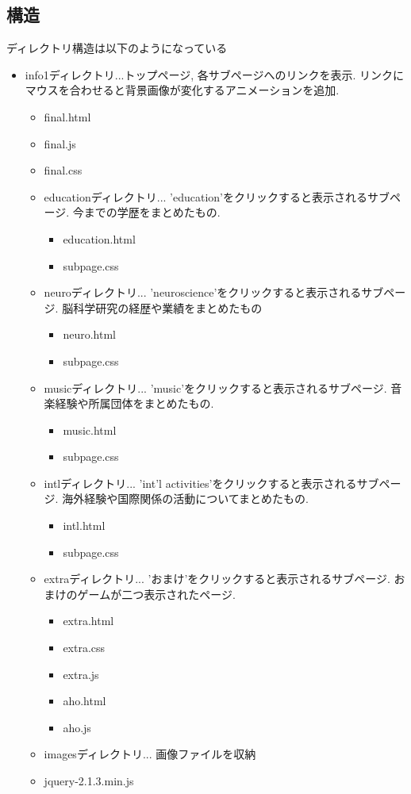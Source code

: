 \documentclass{jarticle}
\begin{document}
\subsection{構造}
ディレクトリ構造は以下のようになっている
\begin{itemize}
	\item info1ディレクトリ...トップページ, 各サブページへのリンクを表示. リンクにマウスを合わせると背景画像が変化するアニメーションを追加.
			\begin{itemize}
				\item final.html
				\item final.js
				\item final.css
		\item educationディレクトリ... 'education'をクリックすると表示されるサブページ. 今までの学歴をまとめたもの.
			\begin{itemize}
				\item education.html
				\item subpage.css
			\end{itemize}
		\item neuroディレクトリ... 'neuroscience'をクリックすると表示されるサブページ. 脳科学研究の経歴や業績をまとめたもの
			\begin{itemize}
				\item neuro.html
				\item subpage.css
			\end{itemize}
		\item musicディレクトリ... 'music'をクリックすると表示されるサブページ. 音楽経験や所属団体をまとめたもの.
			\begin{itemize}
				\item music.html
				\item subpage.css
			\end{itemize}
		\item intlディレクトリ... 'int'l activities'をクリックすると表示されるサブページ. 海外経験や国際関係の活動についてまとめたもの.
			\begin{itemize}
				\item intl.html
				\item subpage.css
			\end{itemize}
		\item extraディレクトリ... 'おまけ'をクリックすると表示されるサブページ. おまけのゲームが二つ表示されたページ.
			\begin{itemize}
				\item extra.html
				\item extra.css
				\item extra.js
				\item aho.html
				\item aho.js
			\end{itemize}
		\item imagesディレクトリ... 画像ファイルを収納
		\item jquery-2.1.3.min.js
  \end{itemize}
\end{itemize}
\end{document}
